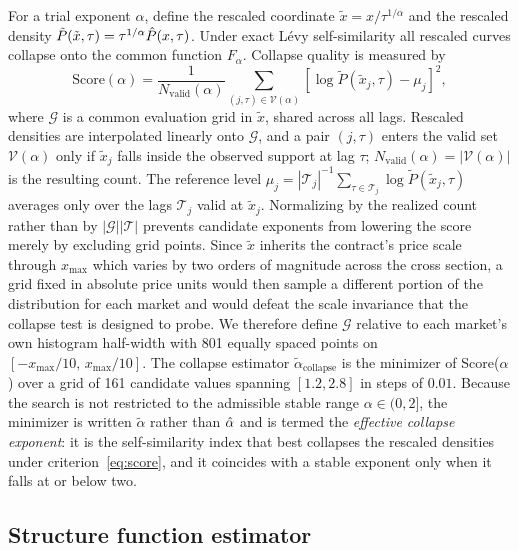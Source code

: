 \documentclass[conference]{IEEEtran}
\begin{document}
For a trial exponent $\alpha$, define the rescaled coordinate
$\tilde{x} = x/\tau^{1/\alpha}$ and the rescaled density
$\tilde{P}(\tilde{x},\tau) = \tau^{1/\alpha}\hat{P}(x,\tau)$. Under exact Lévy
self-similarity all rescaled curves collapse onto the common function
$F_\alpha$. Collapse quality is measured by
\begin{equation}
  \mathrm{Score}(\alpha)
  = \frac{1}{N_{\mathrm{valid}}(\alpha)}
    \sum_{(j,\tau)\in\mathcal{V}(\alpha)}
    \!\left[\log\tilde{P}(\tilde{x}_j,\tau) - \mu_j\right]^2,
  \label{eq:score}
\end{equation}
where $\mathcal{G}$ is a common evaluation grid in $\tilde{x}$, shared across
all lags. Rescaled densities are interpolated linearly onto $\mathcal{G}$, and
a pair $(j,\tau)$ enters the valid set $\mathcal{V}(\alpha)$ only if
$\tilde{x}_j$ falls inside the observed support at lag $\tau$;
$N_{\mathrm{valid}}(\alpha)=|\mathcal{V}(\alpha)|$ is the resulting count.
The reference level $\mu_j = |\mathcal{T}_j|^{-1}
\sum_{\tau\in\mathcal{T}_j}\log\tilde{P}(\tilde{x}_j,\tau)$ averages only
over the lags $\mathcal{T}_j$ valid at $\tilde{x}_j$. Normalizing by the
realized count rather than by $|\mathcal{G}||\mathcal{T}|$ prevents candidate
exponents from lowering the score merely by excluding grid points. Since $\tilde{x}$ inherits the contract's price scale through $x_{\max}$
which varies by two orders of magnitude across the cross section, a grid
fixed in absolute price units would then sample a different portion of the
distribution for each market and would defeat the scale invariance that the
collapse test is designed to probe. We therefore define $\mathcal{G}$
relative to each market's own histogram half-width with 801 equally spaced points
on $[-x_{\max}/10,\,x_{\max}/10]$. The collapse estimator
$\tilde{\alpha}_{\mathrm{collapse}}$ is the minimizer of Score($\alpha$) over a grid
of 161 candidate values spanning $[1.2,2.8]$ in steps of $0.01$. Because the
search is not restricted to the admissible stable range $\alpha\in(0,2]$, the
minimizer is written $\tilde{\alpha}$ rather than $\hat{\alpha}$ and is termed the
\textit{effective collapse exponent}: it is the self-similarity index that best
collapses the rescaled densities under criterion~\eqref{eq:score}, and it
coincides with a stable exponent only when it falls at or below two.

\subsection{Structure function estimator}
\label{sec:methodology:sf}
\end{document}

